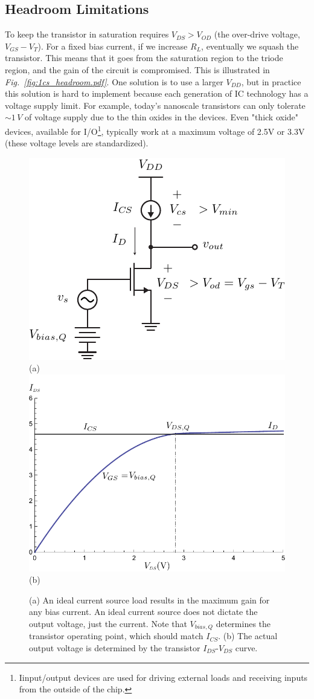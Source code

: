 \subsection{Headroom Limitations}
To keep the transistor in saturation requires $V_{DS} > V_{OD}$ (the over-drive voltage, $V_{GS} - V_T$).  For a fixed bias current, if we increase $R_L$, eventually we squash the transistor.  This means that it goes from the saturation region to the triode region, and the gain of the circuit is compromised.  This is illustrated in \emph{Fig.~\ref{fig:1cs_headroom.pdf}}.  One solution is to use a larger $V_{DD}$, but in practice this solution is hard to implement because each generation of IC technology has a voltage supply limit.  For example, today's nanoscale transistors can only tolerate $\sim 1\,V$ of voltage supply due to the thin oxides in the devices.  Even "thick oxide" devices, available for I/O\footnote{Iinput/output devices are used for driving external loads and receiving inputs from the outside of the chip.}, typically work at a maximum voltage of 2.5V or 3.3V (these voltage levels are standardized).
\begin{figure}[t]
\centering
\includegraphics[width=.55\columnwidth]{2cs_current_mirror_load.pdf}\\
(a)\\
\includegraphics[width=.6\columnwidth]{mos_output_voltage.pdf}\\
(b)\\
\caption{(a) An ideal current source load results in the maximum gain for any bias current.  An ideal current source does not dictate the output voltage, just the current.  Note that $V_{bias,Q}$ determines the transistor operating point, which should match $I_{CS}$.  (b) The actual output voltage is determined by the transistor $I_{DS}$-$V_{DS}$ curve.}
\label{fig:2cs_current_mirror_load.pdf}
\end{figure}
